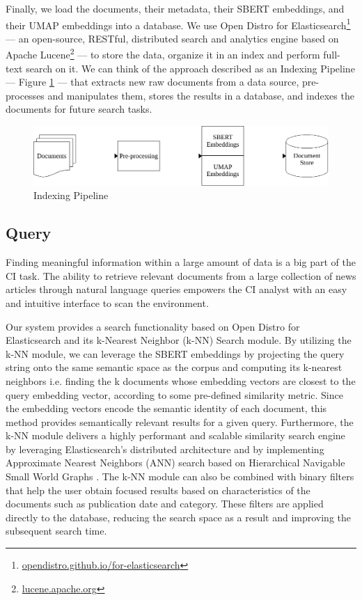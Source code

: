 \documentclass[a4paper]{article}
\begin{document}
Finally, we load the documents, their metadata, their SBERT embeddings, and their UMAP embeddings into a database. We use Open Distro for Elasticsearch\footnote{\href{https://opendistro.github.io/for-elasticsearch/}{opendistro.github.io/for-elasticsearch}} — an open-source, RESTful, distributed search and analytics engine based on Apache Lucene\footnote{\href{https://lucene.apache.org/}{lucene.apache.org}} — to store the data, organize it in an index and perform full-text search on it. We can think of the approach described as an Indexing Pipeline — Figure \ref{indexing_pipeline} — that extracts new raw documents from a data source, pre-processes and manipulates them, stores the results in a database, and indexes the documents for future search tasks.

\begin{figure}[H]
	\centering
	\includegraphics[scale=0.7]{./figures/indexing_pipeline}
	\caption{Indexing Pipeline}
	\label{indexing_pipeline}
\end{figure}

\subsection*{Query}
Finding meaningful information within a large amount of data is a big part of the CI task. The ability to retrieve relevant documents from a large collection of news articles through natural language queries empowers the CI analyst with an easy and intuitive interface to scan the environment.

Our system provides a search functionality based on Open Distro for Elasticsearch and its k-Nearest Neighbor (k-NN) Search module. By utilizing the k-NN module, we can leverage the SBERT embeddings by projecting the query string onto the same semantic space as the corpus and computing its k-nearest neighbors i.e. finding the k documents whose embedding vectors are closest to the query embedding vector, according to some pre-defined similarity metric. Since the embedding vectors encode the semantic identity of each document, this method provides semantically relevant results for a given query. Furthermore, the k-NN module delivers a highly performant and scalable similarity search engine by leveraging Elasticsearch’s distributed architecture and by implementing Approximate Nearest Neighbors (ANN) search based on Hierarchical Navigable Small World Graphs \citep{malkov2018}. The k-NN module can also be combined with binary filters that help the user obtain focused results based on characteristics of the documents such as publication date and category. These filters are applied directly to the database, reducing the search space as a result and improving the subsequent search time.
\end{document}
